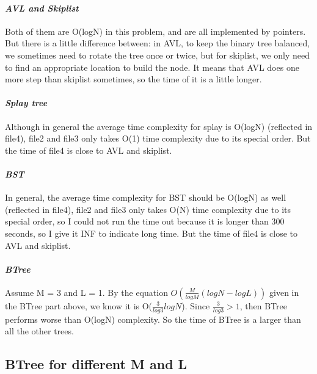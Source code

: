 \documentclass[]{article}
\let\oldparagraph\paragraph
\renewcommand{\paragraph}[1]{\oldparagraph{#1}\mbox{}}
\begin{document}
\paragraph{\texorpdfstring{\emph{AVL and
Skiplist}}{AVL and Skiplist}}\label{avl-and-skiplist}

Both of them are O(logN) in this problem, and are all implemented by
pointers. But there is a little difference between: in AVL, to keep the
binary tree balanced, we sometimes need to rotate the tree once or
twice, but for skiplist, we only need to find an appropriate location to
build the node. It means that AVL does one more step than skiplist
sometimes, so the time of it is a little longer.

\paragraph{\texorpdfstring{\emph{Splay
tree}}{Splay tree}}\label{splay-tree}

Although in general the average time complexity for splay is O(logN)
(reflected in file4), file2 and file3 only takes O(1) time complexity
due to its special order. But the time of file4 is close to AVL and
skiplist.

\paragraph{\texorpdfstring{\emph{BST}}{BST}}\label{bst-1}

In general, the average time complexity for BST should be O(logN) as
well (reflected in file4), file2 and file3 only takes O(N) time
complexity due to its special order, so I could not run the time out
because it is longer than 300 seconds, so I give it INF to indicate long
time. But the time of file4 is close to AVL and skiplist.

\paragraph{\texorpdfstring{\emph{BTree}}{BTree}}\label{btree-1}

Assume M = 3 and L = 1. By the equation \(O(\frac{M}{logM}(logN-logL))\)
given in the BTree part above, we know it is O(\(\frac{3}{log3}logN\)).
Since \(\frac{3}{log3} > 1\), then BTree performs worse than O(logN)
complexity. So the time of BTree is a larger than all the other trees.

\subsection{BTree for different M and
L}\label{btree-for-different-m-and-l}
\end{document}
